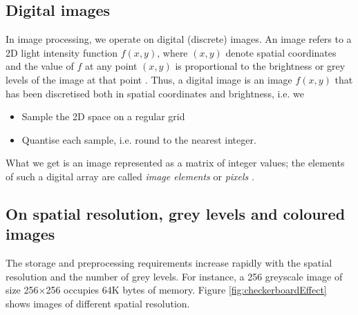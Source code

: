 \subsection{Digital images}

In image processing, we operate on digital (discrete) images.
An image refers to a 2D light intensity function \( f(x,y) \), where \( (x,y) \) denote spatial coordinates and the value of \( f \) at any point \( (x,y) \) is proportional to the brightness or grey levels of the image at that point \cite{imagProcFundamentals}.
Thus, a digital image is an image \( f(x,y)  \) that has been discretised both in spatial coordinates and brightness, i.e. we
\begin{itemize}
	\item Sample the 2D space on a regular grid
	\item Quantise each sample, i.e. round to the nearest integer.
\end{itemize}

What we get is an image represented as a matrix of integer values; the elements of such a digital array are called \textit{image elements} or \textit{pixels} \cite{pydata2018}.




\subsection{On spatial resolution, grey levels and coloured images}

The storage and preprocessing requirements increase rapidly with the spatial resolution and the number of grey levels. 
For instance, a 256 greyscale image of size 256\( \times \)256 occupies 64K bytes of memory. Figure \ref{fig:checkerboardEffect} shows images of different spatial resolution. 

